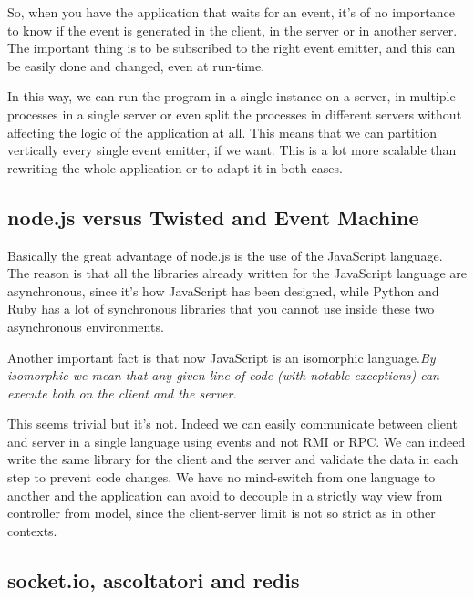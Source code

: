 So, when you have the application that waits for an event, it's of no importance to know if the event is generated in the client, in the server or in another server. The important thing is to be subscribed to the right event emitter, and this can be easily done and changed, even at run-time.

In this way, we can run the program in a single instance on a server, in multiple processes in a single server or even split the processes in different servers without affecting the logic of the application at all. This means that we can partition vertically every single event emitter, if we want. This is a lot more scalable than rewriting the whole application or to adapt it in both cases.

\subsection{node.js versus Twisted and Event Machine}

Basically the great advantage of node.js is the use of the JavaScript language. The reason is that all the libraries already written for the JavaScript language are asynchronous, since it's how JavaScript has been designed, while Python and Ruby has a lot of synchronous libraries that you cannot use inside these two asynchronous environments.

Another important fact is that now JavaScript is an isomorphic language.\textit{By isomorphic we mean that any given line of code (with notable exceptions) can execute both on the client and the server.}\cite{website:isomorfic}

This seems trivial but it's not. Indeed we can easily communicate between client and server in a single language using events and not RMI or RPC. We can indeed write the same library for the client and the server and validate the data in each step to prevent code changes. We have no mind-switch from one language to another and the application can avoid to decouple in a strictly way view from controller from model, since the client-server limit is not so strict as in other contexts.

\subsection{socket.io, ascoltatori and redis}

